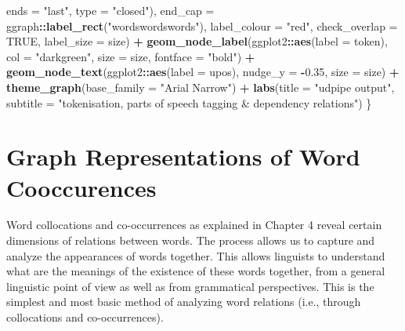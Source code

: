 \documentclass[
]{article}
\newenvironment{Shaded}{\begin{snugshade}}{\end{snugshade}}
\newcommand{\AttributeTok}[1]{\textcolor[rgb]{0.13,0.29,0.53}{#1}}
\newcommand{\ConstantTok}[1]{\textcolor[rgb]{0.56,0.35,0.01}{#1}}
\newcommand{\FloatTok}[1]{\textcolor[rgb]{0.00,0.00,0.81}{#1}}
\newcommand{\FunctionTok}[1]{\textcolor[rgb]{0.13,0.29,0.53}{\textbf{#1}}}
\newcommand{\NormalTok}[1]{#1}
\newcommand{\SpecialCharTok}[1]{\textcolor[rgb]{0.81,0.36,0.00}{\textbf{#1}}}
\newcommand{\StringTok}[1]{\textcolor[rgb]{0.31,0.60,0.02}{#1}}
\begin{document}
\begin{Shaded}
\begin{Highlighting}[]
                            \AttributeTok{ends =} \StringTok{"last"}\NormalTok{,}
                            \AttributeTok{type =} \StringTok{"closed"}\NormalTok{),}
        \AttributeTok{end\_cap =}\NormalTok{ ggraph}\SpecialCharTok{::}\FunctionTok{label\_rect}\NormalTok{(}\StringTok{"wordswordswords"}\NormalTok{),}
        \AttributeTok{label\_colour =} \StringTok{"red"}\NormalTok{, }\AttributeTok{check\_overlap =} \ConstantTok{TRUE}\NormalTok{, }\AttributeTok{label\_size =}\NormalTok{ size) }\SpecialCharTok{+}
      \FunctionTok{geom\_node\_label}\NormalTok{(ggplot2}\SpecialCharTok{::}\FunctionTok{aes}\NormalTok{(}\AttributeTok{label =}\NormalTok{ token), }
                      \AttributeTok{col =} \StringTok{"darkgreen"}\NormalTok{,}
                      \AttributeTok{size =}\NormalTok{ size, }\AttributeTok{fontface =} \StringTok{"bold"}\NormalTok{) }\SpecialCharTok{+}
      \FunctionTok{geom\_node\_text}\NormalTok{(ggplot2}\SpecialCharTok{::}\FunctionTok{aes}\NormalTok{(}\AttributeTok{label =}\NormalTok{ upos), }\AttributeTok{nudge\_y =} \SpecialCharTok{{-}}\FloatTok{0.35}\NormalTok{, }\AttributeTok{size =}\NormalTok{ size) }\SpecialCharTok{+}
      \FunctionTok{theme\_graph}\NormalTok{(}\AttributeTok{base\_family =} \StringTok{"Arial Narrow"}\NormalTok{) }\SpecialCharTok{+}  
      \FunctionTok{labs}\NormalTok{(}\AttributeTok{title =} \StringTok{"udpipe output"}\NormalTok{, }
         \AttributeTok{subtitle =} \StringTok{"tokenisation, parts of speech tagging \& dependency relations"}\NormalTok{)}
\NormalTok{\}}
\end{Highlighting}
\end{Shaded}

\normalsize

\hypertarget{graph-representations-of-word-cooccurrences}{%
\section{Graph Representations of Word Cooccurences}\label{graph-representations-of-word-cooccurrences}}

Word collocations and co-occurrences as explained in Chapter 4 reveal certain dimensions of relations between words. The process allows us to capture and analyze the appearances of words together. This allows linguists to understand what are the meanings of the existence of these words together, from a general linguistic point of view as well as from grammatical perspectives. This is the simplest and most basic method of analyzing word relations (i.e., through collocations and co-occurrences).
\end{document}
